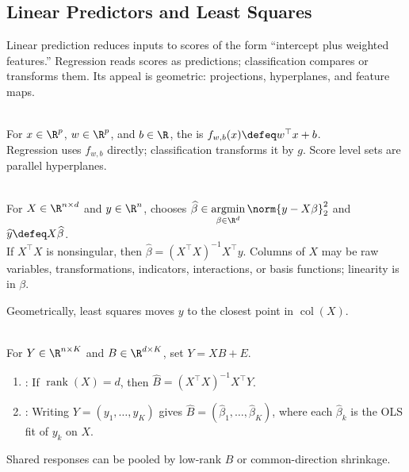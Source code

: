 \subsection{Linear Predictors and Least Squares}
Linear prediction reduces inputs to scores of the form ``intercept plus weighted features.'' Regression reads scores as predictions; classification compares or transforms them.  Its appeal is geometric: projections, hyperplanes, and feature maps.

\begin{definition} \label{def:sl-linear-predictor} \\
For $x\in\R^p$, $w\in\R^p$, and $b\in\R$, the  is $f_{w,b}(x)\defeq w^\top x+b$.\\
Regression uses $f_{w,b}$ directly; classification transforms it by $g$. Score level sets are parallel hyperplanes.
\end{definition}

\begin{definition} \label{def:sl-least-squares-linear-regression} \\
For $X\in\R^{n\times d}$ and $y\in\R^n$,  chooses $\widehat{\beta}\in\operatorname*{argmin}\limits_{\beta\in\R^d}\norm{y-X\beta}_2^2$ and $\widehat{y}\defeq X\widehat{\beta}$.\\
If $X^\top X$ is nonsingular, then $\widehat{\beta}=(X^\top X)^{-1}X^\top y$. Columns of $X$ may be raw variables, transformations, indicators, interactions, or basis functions; linearity is in $\beta$.
\end{definition}

Geometrically, least squares moves $y$ to the closest point in $\operatorname{col}(X)$.

\begin{method} \label{meth:sl-multiple-output-least-squares} \\
For $Y\in\R^{n\times K}$ and $B\in\R^{d\times K}$, set $Y=XB+E$.
\begin{enumerate}[label=(\roman*)]
\setlength{\itemsep}{0pt}
\item {}: If $\operatorname{rank}(X)=d$, then $\widehat{B}=(X^\top X)^{-1}X^\top Y$.
\item {}: Writing $Y=(y_1,\ldots,y_K)$ gives $\widehat{B}=(\widehat{\beta}_1,\ldots,\widehat{\beta}_K)$, where each $\widehat{\beta}_k$ is the OLS fit of $y_k$ on $X$.
\end{enumerate}
Shared responses can be pooled by low-rank $B$ or common-direction shrinkage.
\end{method}

